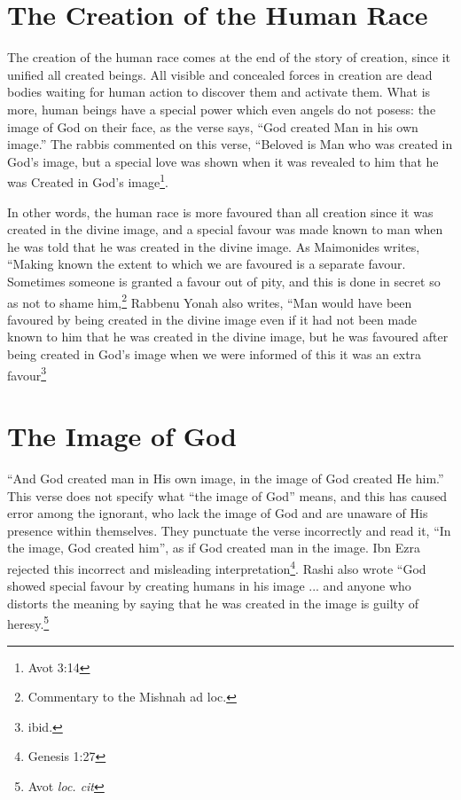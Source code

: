 \documentclass[11pt, a5paper, twoside, chapterprefix, openany]{scrbook}
\begin{document}
\chapter{The Creation of the Human Race}

The creation of the human race comes at the end of the story of creation, since it unified all created beings. All visible and concealed forces in creation are dead bodies waiting for human action to discover them and activate them. What is more, human beings have a special power which even angels do not posess: the image of God on their face, as the verse says, “God created Man in his own image.” The rabbis commented on this verse, “Beloved is Man who was created in God’s image, but a special love was shown when it was revealed to him that he was Created in God’s image\footnote{Avot 3:14}.

In other words, the human race is more favoured than all creation since it was created in the divine image, and a special favour was made known to man when he was told that he was created in the divine image. As Maimonides writes, “Making known the extent to which we are favoured is a separate favour. Sometimes someone is granted a favour out of pity, and this is done in secret so as not to shame him,\footnote{Commentary to the Mishnah ad loc.} Rabbenu Yonah also writes, “Man would have been favoured by being created in the divine image even if it had not been made known to him that he was created in the divine image, but he was favoured after being created in God’s image when we were informed of this it was an extra favour\footnote{ibid.}

\chapter{The Image of God}

``And God created man in His own image, in the image of God created He him.'' This verse does not specify what ``the image of God'' means, and this has caused error among the ignorant, who lack the image of God and are unaware of His presence within themselves. They punctuate the verse incorrectly and read it, ``In the image, God created him'', as if God created man in the image. Ibn Ezra rejected this incorrect and misleading interpretation\footnote{Genesis 1:27}. Rashi also wrote ``God showed special favour by creating humans in his image ... and anyone who distorts the meaning by saying that he was created in the image is guilty of heresy.\footnote{Avot \textit{loc. cit}}
\end{document}
